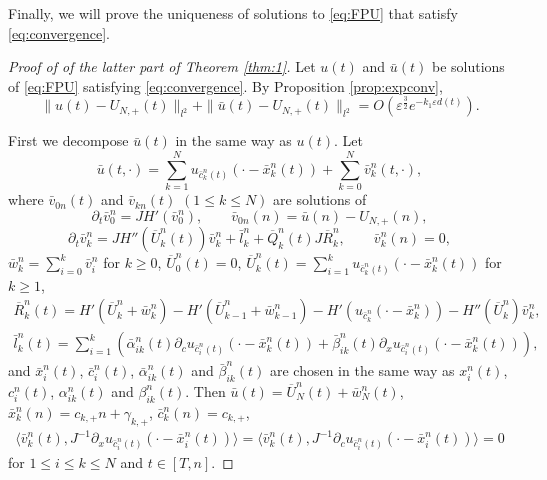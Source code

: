 \documentclass[11pt]{amsart}
\theoremstyle{remark}
\numberwithin{equation}{section}
\begin{document}
Finally, we will prove the uniqueness of solutions to \eqref{eq:FPU}
that satisfy \eqref{eq:convergence}.
\begin{proof}[Proof of of the latter part of Theorem \ref{thm:1}]
Let $u(t)$ and $\bar{u}(t)$ be solutions of \eqref{eq:FPU} satisfying
\eqref{eq:convergence}. By Proposition \ref{prop:expconv},
$$\|u(t)-U_{N,+}(t)\|_{l^2}+\|\bar{u}(t)-U_{N,+}(t)\|_{l^2}
=O({\varepsilon}^{\frac32}e^{-k_1{\varepsilon} d(t)}).$$
\par
First we decompose $\bar{u}(t)$ in the same way as $u(t)$. 
Let
$$\bar{u}(t,\cdot)=\sum_{k=1}^Nu_{\bar{c}_k^n(t)}(\cdot-\bar{x}_k^n(t))
+\sum_{k=0}^N\bar{v}_k^n(t,\cdot),$$
where $\bar{v}_{0n}(t)$ and $\bar{v}_{kn}(t)$ $(1\le k\le N)$ are solutions of
$${\partial}_t\bar{v}_0^n=JH'(\bar{v}_0^n),\qquad
\bar{v}_{0n}(n)=\bar{u}(n)-U_{N,+}(n),$$
$${\partial}_t\bar{v}_k^n=JH''(\overline{U}_k^n(t))\bar{v}_k^n+\bar{l}_k^n
+\overline{Q}_k^n(t)J\overline{R}_k^n,\qquad \bar{v}_k^n(n)=0,$$
$\bar{w}_k^n=\sum_{i=0}^k\bar{v}_i^n$ for $k\ge 0$, $\overline{U}_0^n(t)=0$,
$\overline{U}_k^n(t)=\sum_{i=1}^ku_{\bar{c}_k^n(t)}(\cdot-\bar{x}_k^n(t))$
for $k\ge1$,
\begin{gather*}
\overline{R}_k^n(t)=H'(\overline{U}_k^n+\bar{w}_k^n)
-H'(\overline{U}_{k-1}^n+\bar{w}_{k-1}^n)-H'(u_{\bar{c}_k^n}(\cdot-\bar{x}_k^n))
-H''(\overline{U}_k^n)\bar{v}_k^n,\\
\bar{l}_k^n(t)=\sum_{i=1}^k\left(\bar{\alpha}_{ik}^n(t)
{\partial}_cu_{\bar{c}_i^n(t)}(\cdot-\bar{x}_k^n(t))
+\bar{\beta}_{ik}^n(t){\partial}_xu_{\bar{c}_i^n(t)}(\cdot-\bar{x}_k^n(t))\right),
\end{gather*}
and  $\bar{x}_i^n(t)$, $\bar{c}_i^n(t)$, $\bar{\alpha}_{ik}^n(t)$ and
$\bar{\beta}_{ik}^n(t)$ are chosen in the same way as 
$x_i^n(t)$, $c_i^n(t)$, $\alpha_{ik}^n(t)$ and $\beta_{ik}^n(t)$.
Then $\bar{u}(t)=\overline{U}_N^n(t)+\bar{w}_N^n(t)$,
$\bar{x}_k^n(n)=c_{k,+}n+\gamma_{k,+}$, $\bar{c}_k^n(n)=c_{k,+}$,
\begin{gather*}
{\langle} \bar{v}_k^n(t),J^{-1}{\partial}_xu_{\bar{c}_i^n(t)}(\cdot-\bar{x}_i^n(t)){\rangle}
={\langle} \bar{v}_k^n(t),J^{-1}{\partial}_cu_{\bar{c}_i^n(t)}(\cdot-\bar{x}_i^n(t)){\rangle}=0  
\end{gather*}
for $1\le i\le k\le N$ and $t\in[T,n]$.
\par


\end{proof}
\end{document}
